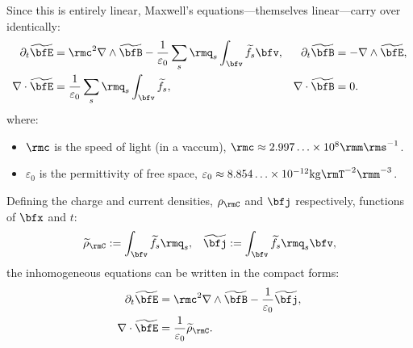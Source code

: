     Since this is entirely linear, Maxwell's equations---themselves linear---carry over identically:
    \begin{align}
        \partial_{t}\widetilde{\bfE}  &=  \rmc^{2}\nabla\wedge\widetilde{\bfB} - \frac{1}{\varepsilon_{0}}\sum_{s}\rmq_{s}\int_{\bfv}\widetilde{f}_{s}\bfv,  &
        \partial_{t}\widetilde{\bfB}  &=  - \nabla\wedge\widetilde{\bfE},  \label{eqn:Maxwell's equations transient}  \\
        \nabla\cdot\widetilde{\bfE}  &=  \frac{1}{\varepsilon_{0}}\sum_{s}\rmq_{s}\int_{\bfv}\widetilde{f}_{s},  &
        \nabla\cdot\widetilde{\bfB}  &=  0.  \label{eqn:Maxwell's equations steady-state}
    \end{align}
    where:
    \begin{itemize}
        \item  $\rmc$ is the speed of light (in a vaccum), $\rmc  \approx  2.997\ldots\times 10^{8}\rmm\rms^{- 1}$.
        \item  $\varepsilon_{0}$ is the permittivity of free space, $\varepsilon_{0}  \approx  8.854\ldots\times 10^{- 12}{\rm kg}\rmT^{- 2}\rmm^{- 3}$.
    \end{itemize}

    Defining the charge and current densities, $\rho_{\rmC}$ and $\bfj$ respectively, functions of $\bfx$ and $t$:
    \begin{align}
        \widetilde{\rho}_{\rmC}  :=  \int_{\bfv}\widetilde{f}_{s}\rmq_{s},  &&
               \widetilde{\bfj}  :=  \int_{\bfv}\widetilde{f}_{s}\rmq_{s}\bfv,
    \end{align}
    the inhomogeneous equations can be written in the compact forms:
    \begin{align*}
        \partial_{t}\widetilde{\bfE}  &=  \rmc^{2}\nabla\wedge\widetilde{\bfB} - \frac{1}{\varepsilon_{0}}\widetilde{\bfj},  \\
        \nabla\cdot\widetilde{\bfE}  &=  \frac{1}{\varepsilon_{0}}\widetilde{\rho}_{\rmC}.
    \end{align*}
    
